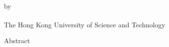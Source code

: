 \begin{center}
{\Large \thesistitle}\\
\vspace{20mm}
by \thesisauthor\\
\departmentname\\
The Hong Kong University of Science and Technology
\end{center}
\vspace{8mm}
\begin{center}
Abstract
\end{center}
\par
\noindent


